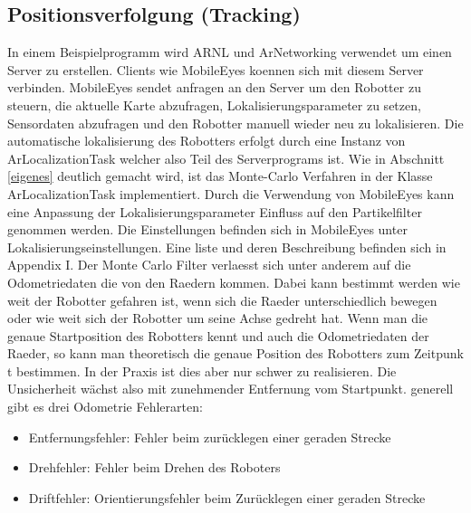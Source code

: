 \documentclass{article}
\begin{document}
\subsection{Positionsverfolgung (Tracking)}
In einem Beispielprogramm wird ARNL und ArNetworking verwendet um einen Server zu erstellen. Clients wie MobileEyes koennen sich mit diesem Server verbinden. MobileEyes sendet anfragen an den Server um den Robotter zu steuern, die aktuelle Karte abzufragen, Lokalisierungsparameter zu setzen, Sensordaten abzufragen und den Robotter manuell wieder neu zu lokalisieren.
Die automatische lokalisierung des Robotters erfolgt durch eine Instanz von ArLocalizationTask welcher also Teil des Serverprograms ist. Wie in Abschnitt \ref{eigenes} deutlich gemacht wird, ist das Monte-Carlo Verfahren in der Klasse ArLocalizationTask implementiert.
Durch die Verwendung von MobileEyes kann eine Anpassung der Lokalisierungsparameter Einfluss auf den Partikelfilter genommen werden.
Die Einstellungen befinden sich in MobileEyes unter Lokalisierungseinstellungen. Eine  liste und deren Beschreibung befinden sich in Appendix I.
Der Monte Carlo Filter verlaesst sich unter anderem auf die Odometriedaten die von den Raedern kommen. Dabei kann bestimmt werden wie weit der Robotter gefahren ist, wenn sich die Raeder unterschiedlich bewegen oder  wie weit sich der Robotter um seine Achse gedreht hat. Wenn man die genaue Startposition des Robotters kennt und auch die Odometriedaten der Raeder, so kann man theoretisch die genaue Position des Robotters zum Zeitpunk t bestimmen. In der Praxis ist dies aber nur schwer zu realisieren. Die Unsicherheit
w\"achst also mit zunehmender Entfernung vom Startpunkt. generell gibt es drei Odometrie Fehlerarten:
\begin{itemize}
\item Entfernungsfehler: Fehler beim zur\"ucklegen einer geraden Strecke
\item Drehfehler: Fehler beim Drehen des Roboters
\item Driftfehler: Orientierungsfehler beim Zur\"ucklegen einer geraden Strecke
\end{itemize}
\end{document}
